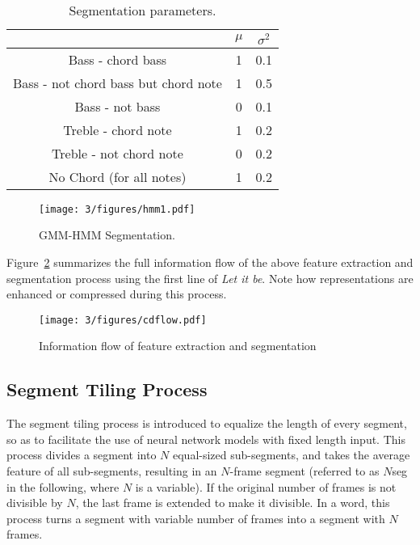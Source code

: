 \begin{table}
\caption{Segmentation parameters.}
\centering
\footnotesize
\begin{tabular}{|c|c|c|} \hline
      & $\mu$ & $\sigma^2$ \\ \hline
 Bass - chord bass & 1 & 0.1 \\ \hline
 Bass - not chord bass but chord note & 1 & 0.5  \\ \hline
 Bass - not bass & 0 & 0.1 \\ \hline
 Treble - chord note & 1 & 0.2  \\ \hline
 Treble - not chord note & 0 & 0.2 \\ \hline
 No Chord (for all notes)  & 1 & 0.2  \\ \hline
\end{tabular}
\label{tab:3-gaussian}
\end{table}

\begin{figure}[htb]
\centering
\texttt{[image: 3/figures/hmm1.pdf]}
\caption{GMM-HMM Segmentation.}
\label{fig:3-hmm1}
\end{figure}

Figure~\ref{fig:3-cdflow} summarizes the full information flow of the above feature extraction and segmentation process using the first line of {\it Let it be}. Note how representations are enhanced or compressed during this process.
\begin{figure}[h]
\centering
\texttt{[image: 3/figures/cdflow.pdf]}
\caption{Information flow of feature extraction and segmentation}
\label{fig:3-cdflow}
\end{figure}

\subsection{Segment Tiling Process} \label{sec:3-seg-tile}

The segment tiling process is introduced to equalize the length of every segment, so as to facilitate the use of neural network models with fixed length input. This process divides a segment into $N$ equal-sized sub-segments, and takes the average feature of all sub-segments, resulting in an $N$-frame segment (referred to as $N$seg in the following, where $N$ is a variable). If the original number of frames is not divisible by $N$, the last frame is extended to make it divisible. In a word, this process turns a segment with variable number of frames into a segment with $N$ frames.

